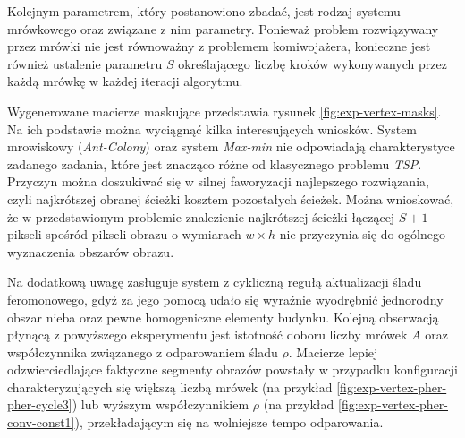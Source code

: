 {{{            %
            Kolejnym parametrem, który postanowiono zbadać, jest rodzaj systemu mrówkowego oraz związane z nim
            parametry. Ponieważ problem rozwiązywany przez mrówki nie jest równoważny z problemem komiwojażera,
            konieczne jest również ustalenie parametru $S$ określającego liczbę kroków wykonywanych przez każdą mrówkę w
            każdej iteracji algorytmu.

            Wygenerowane macierze maskujące przedstawia rysunek \ref{fig:exp-vertex-masks}. Na ich podstawie można
            wyciągnąć kilka interesujących wniosków. System mrowiskowy (\textit{Ant-Colony}) oraz system
            \textit{Max-min} nie odpowiadają charakterystyce zadanego zadania, które jest znacząco różne od klasycznego
            problemu \textit{TSP}. Przyczyn można doszukiwać się w silnej faworyzacji najlepszego rozwiązania, czyli
            najkrótszej obranej ścieżki kosztem pozostałych ścieżek. Można wnioskować, że w przedstawionym problemie
            znalezienie najkrótszej ścieżki łączącej $S + 1$ pikseli spośród pikseli obrazu o wymiarach $w \times h$ nie
            przyczynia się do ogólnego wyznaczenia obszarów obrazu.

            Na dodatkową uwagę zasługuje system z cykliczną regułą aktualizacji śladu feromonowego, gdyż za jego pomocą
            udało się wyraźnie wyodrębnić jednorodny obszar nieba oraz pewne homogeniczne elementy budynku. Kolejną
            obserwacją płynącą z powyższego eksperymentu jest istotność doboru liczby mrówek $A$ oraz współczynnika
            związanego z odparowaniem śladu $\rho$. Macierze lepiej odzwierciedlające faktyczne segmenty obrazów
            powstały w przypadku konfiguracji charakteryzujących się większą liczbą mrówek (na przykład
            \ref{fig:exp-vertex-pher-pher-cycle3}) lub wyższym współczynnikiem $\rho$ (na przykład
            \ref{fig:exp-vertex-pher-conv-const1}), przekładającym się na wolniejsze tempo odparowania.

}}}
